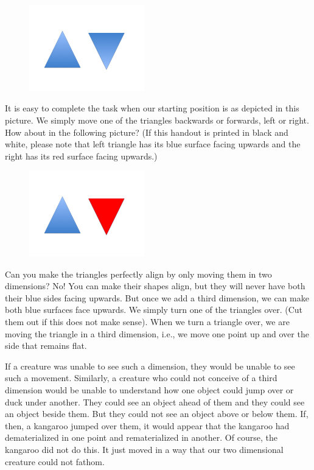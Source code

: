 \documentclass[oneside]{article}
\begin{document}
\begin{figure}[h]
\centering
  \includegraphics[width=50mm]{2d.jpg}
\end{figure}

It is easy to complete the task when our starting position is as depicted in this picture. We simply move one of the triangles backwards or forwards, left or right. How about in the following picture? (If this handout is printed in black and white, please note that left triangle has its blue surface facing upwards and the right has its red surface facing upwards.)




\begin{figure}[h]
\centering
  \includegraphics[width=50mm]{3d.jpg}
\end{figure}

Can you make the triangles perfectly align by only moving them in two dimensions? No! You can make their shapes align, but they will never have both their blue sides facing upwards. But once we add a third dimension, we can make both blue surfaces face upwards. We simply turn one of the triangles over.  (Cut them out if this does not make sense). When we turn a triangle over, we are moving the triangle in a third dimension, i.e., we move one point up and over the side that remains flat. 

If a creature was unable to see such a dimension, they would be unable to see such a movement.  Similarly, a creature who could not conceive of a third dimension would be unable to understand how one object could jump over or duck under another.  They could see an object ahead of them and they could see an object beside them. But they could not see an object above or below them. If, then, a kangaroo jumped over them, it would appear that the kangaroo had dematerialized in one point and rematerialized in another. Of course, the kangaroo did not do this. It just moved in a way that our two dimensional creature could not fathom. 
\end{document}
